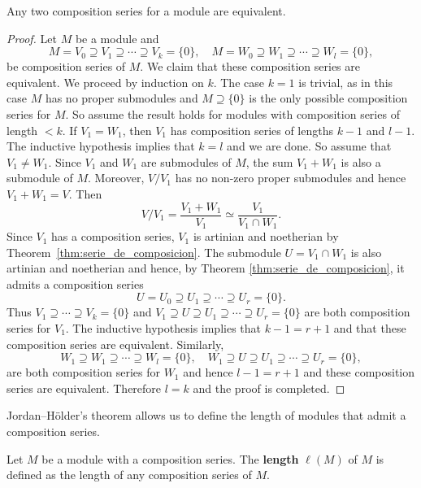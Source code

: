 \begin{theorem}
	\label{thm:JordanHolder}
	Any two composition series for a module are equivalent. 
\end{theorem}

\begin{proof}
    Let $M$ be a module and
    \[
		M=V_0\supseteq V_1\supseteq\cdots\supseteq V_k=\{0\},
		\quad
		M=W_0\supseteq W_1\supseteq\cdots\supseteq W_l=\{0\},
	\]
	be composition series of $M$. 
	We claim that these composition series are equivalent. 
	We proceed by induction on $k$. The case $k=1$ is trivial, as 
	in this case $M$ has no proper submodules and $M\supseteq\{0\}$ 
	is the only possible composition series for $M$. So
	assume the result holds for modules with composition series of length $<k$. If $V_1=W_1$, then 
	$V_1$ has composition series of lengths $k-1$ and $l-1$. The inductive hypothesis implies that 
	$k=l$ and we are done. So assume that $V_1\ne W_1$. Since $V_1$ and $W_1$ are submodules of $M$, the
	sum $V_1+W_1$ is also a submodule of $M$. Moreover, $V/V_1$ has no non-zero proper submodules
	and hence 
	$V_1+W_1=V$. Then 
	\[
		V/V_1=\frac{V_1+W_1}{V_1}\simeq\frac{V_1}{V_1\cap W_1}.
	\]
	Since $V_1$ has a composition series, $V_1$ is artinian and
	noetherian by Theorem~\ref{thm:serie_de_composicion}. The submodule $U=V_1\cap W_1$ is also 
	artinian and noetherian and hence, by Theorem \ref{thm:serie_de_composicion}, 
	it admits a composition series 
	\[
		U=U_0\supseteq U_1\supseteq\cdots\supseteq U_r=\{0\}.
	\]
    Thus
    $V_1\supseteq\cdots\supseteq V_k=\{0\}$ and  
	$V_1\supseteq U\supseteq U_1\supseteq\cdots\supseteq U_r=\{0\}$ are both composition 
	series for $V_1$. The inductive hypothesis implies that 
	$k-1=r+1$ and that these composition series are equivalent. Similarly, 
	\[
		W_1\supseteq W_1\supseteq\cdots\supseteq W_l=\{0\},
		\quad
		W_1\supseteq U\supseteq U_1\supseteq\cdots\supseteq U_{r}=\{0\},
	\]
    are both composition series for $W_1$ and hence $l-1=r+1$ and these composition 
    series are equivalent. Therefore $l=k$ and the proof is completed. 
\end{proof}

Jordan--H\"older's theorem allows us to define the 
length of modules that admit a composition series. 

\begin{definition}
    Let $M$ be a module with a composition series. 
    The \textbf{length} $\ell(M)$ of $M$ is defined as the length of any composition series of $M$. 
\end{definition}

